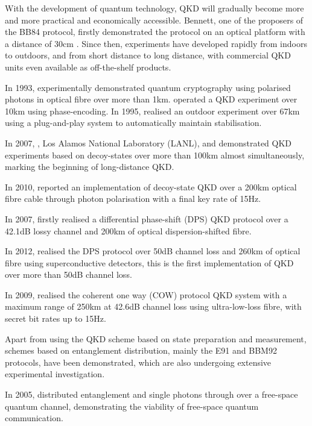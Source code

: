 \documentclass[aps,rmp,twocolumn,amsmath,amssymb,nofootinbib,superscriptaddress,longbibliography,floatfix,table-of-contents,eqsecnum]{revtex4-1}
\begin{document}
With the development of quantum technology, QKD will gradually become more and more practical and economically accessible. Bennett, one of the proposers of the BB84 protocol, firstly demonstrated the protocol on an optical platform with a distance of 30cm \cite{bib:JC_5_3}. Since then, experiments have developed rapidly from indoors to outdoors, and from short distance to long distance, with commercial QKD units even available as off-the-shelf products.

In 1993, \cite{bib:EL_23_383} experimentally demonstrated quantum cryptography using polarised photons in optical fibre over more than 1km. \cite{bib:EL_29_634} operated a QKD experiment over 10km using phase-encoding. In 1995, \cite{bib:Arx0203118} realised an outdoor experiment over 67km using a plug-and-play system to automatically maintain stabilisation.

In 2007, \cite{bib:PRL_98_010505}, Los Alamos National Laboratory (LANL), \cite{bib:PRL_09_010503x} and \cite{bib:PRL_98_010504} demonstrated QKD experiments based on decoy-states over more than 100km almost simultaneously, marking the beginning of long-distance QKD.

In 2010, \cite{bib:OptExp_18_8587} reported an implementation of decoy-state QKD over a 200km optical fibre cable through photon polarisation with a final key rate of 15Hz.

In 2007, \cite{bib:NP_1_343} firstly realised a differential phase-shift (DPS) QKD protocol over a 42.1dB lossy channel and 200km of optical dispersion-shifted fibre.

In 2012, \cite{bib:OL_37_1008} realised the DPS protocol over 50dB channel loss and 260km of optical fibre using superconductive detectors, this is the first implementation of QKD over more than 50dB channel loss.

In 2009, \cite{bib:NJP_11_075003} realised the coherent one way (COW) protocol QKD system with a maximum range of 250km at 42.6dB channel loss using ultra-low-loss fibre, with secret bit rates up to 15Hz.
 
Apart from using the QKD scheme based on state preparation and measurement, schemes based on entanglement distribution, mainly the E91 \cite{bib:PRL_67_661} and BBM92 \cite{bib:PRL_68_557} protocols, have been demonstrated, which are also undergoing extensive experimental investigation.

In 2005, \cite{bib:OE_13_202} distributed entanglement and single photons through over a free-space quantum channel, demonstrating the viability of free-space quantum communication. 
\end{document}
